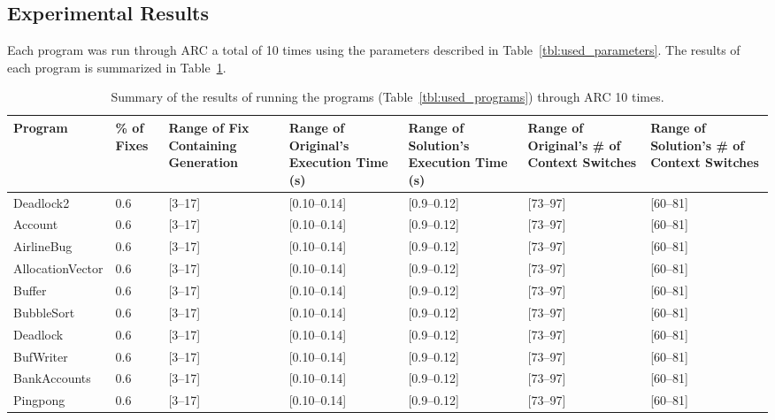 \documentclass{llncs}
\begin{document}
\subsection{Experimental Results}
\label{sec:experimental_results}

Each program was run through ARC a total of 10 times using the parameters
described in Table~\ref{tbl:used_parameters}. The results of each program is
summarized in Table~\ref{tbl:summary_results}.

\begin{table}[!t]
\caption{Summary of the results of running the programs
(Table~\ref{tbl:used_programs}) through ARC 10 times.}
\begin{center}
\begin{tabular}{|p{2cm}|p{0.6cm}|p{1.75cm}|p{2cm}|p{2cm}|p{2cm}|p{2cm}|}
\hline
\textbf{Program} &
\textbf{\% of Fixes} &
\textbf{Range of Fix Containing Generation} &
\textbf{Range of Original's Execution Time (s)} &
\textbf{Range of Solution's Execution Time (s)} &
\textbf{Range of Original's \# of Context Switches} &
\textbf{Range of Solution's \# of Context Switches}
\\\hline
Deadlock2 & 0.6 & [3--17] & [0.10--0.14] & [0.9--0.12] & [73--97] & [60--81]
\\\hline
Account & 0.6 & [3--17] & [0.10--0.14] & [0.9--0.12] & [73--97] & [60--81]
\\\hline
AirlineBug & 0.6 & [3--17] & [0.10--0.14] & [0.9--0.12] & [73--97] & [60--81]
\\\hline
AllocationVector & 0.6 & [3--17] & [0.10--0.14] & [0.9--0.12] & [73--97] & [60--81]
\\\hline
Buffer & 0.6 & [3--17] & [0.10--0.14] & [0.9--0.12] & [73--97] & [60--81]
\\\hline
BubbleSort & 0.6 & [3--17] & [0.10--0.14] & [0.9--0.12] & [73--97] & [60--81]
\\\hline
Deadlock & 0.6 & [3--17] & [0.10--0.14] & [0.9--0.12] & [73--97] & [60--81]
\\\hline
BufWriter & 0.6 & [3--17] & [0.10--0.14] & [0.9--0.12] & [73--97] & [60--81]
\\\hline
BankAccounts & 0.6 & [3--17] & [0.10--0.14] & [0.9--0.12] & [73--97] & [60--81]
\\\hline
Pingpong & 0.6 & [3--17] & [0.10--0.14] & [0.9--0.12] & [73--97] & [60--81]
\\\hline
\end{tabular}
\label{tbl:summary_results}
\end{center}
\end{table}
\end{document}
